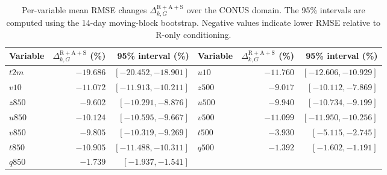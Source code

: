 \begin{table}[!htbp]
\centering
\small
\caption{Per-variable mean RMSE changes
$\Delta_{k,G}^{\mathrm{R+A+S}}$ over the CONUS domain. The 95\% intervals are
computed using the 14-day moving-block bootstrap. Negative values indicate
lower RMSE relative to R-only conditioning.}
\label{tab:per_variable_bootstrap_final}
\renewcommand{\arraystretch}{1.08}
\begin{tabular*}{\textwidth}{@{\extracolsep{\fill}}lrrlrr@{}}
\toprule
Variable & $\Delta_{k,G}^{\mathrm{R+A+S}}$ (\%) & 95\% interval (\%) &
Variable & $\Delta_{k,G}^{\mathrm{R+A+S}}$ (\%) & 95\% interval (\%) \\
\midrule
$t2m$  & $-19.686$ & $[-20.452,-18.901]$ &
$u10$  & $-11.760$ & $[-12.606,-10.929]$ \\
$v10$  & $-11.072$ & $[-11.913,-10.211]$ &
$z500$ & $-9.017$  & $[-10.112,-7.869]$ \\
$z850$ & $-9.602$  & $[-10.291,-8.876]$ &
$u500$ & $-9.940$  & $[-10.734,-9.199]$ \\
$u850$ & $-10.124$ & $[-10.595,-9.667]$ &
$v500$ & $-11.099$ & $[-11.950,-10.256]$ \\
$v850$ & $-9.805$  & $[-10.319,-9.269]$ &
$t500$ & $-3.930$  & $[-5.115,-2.745]$ \\
$t850$ & $-10.905$ & $[-11.488,-10.311]$ &
$q500$ & $-1.392$  & $[-1.602,-1.191]$ \\
$q850$ & $-1.739$  & $[-1.937,-1.541]$ &
& & \\
\bottomrule
\end{tabular*}
\end{table}
